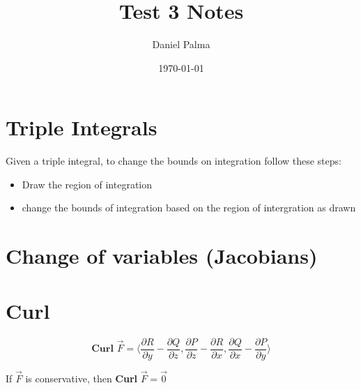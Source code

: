 \documentclass{article}
\author{Daniel Palma}
\date{\today}
\title{Test 3 Notes}
\begin{document}
\maketitle
\newpage

\tableofcontents
\newpage

\section{Triple Integrals} 

Given a triple integral, to change the bounds on integration follow these steps:

\begin{itemize}
    \item Draw the region of integration
    \item change the bounds of integration based on the region of intergration as drawn 
\end{itemize}

\section{Change of variables (Jacobians)}



\newpage
\section{Curl}

$$\textbf{Curl }\vec{F} = \langle \frac{\partial R}{\partial y} - \frac{\partial Q}{\partial z}, \frac{\partial P}{\partial z} - \frac{\partial R}{\partial x}, \frac{\partial Q}{\partial x} - \frac{\partial P}{\partial y} \rangle $$

If $\vec{F}$ is conservative, then \textbf{Curl} $\vec{F} = \vec{0}$
\end{document}
